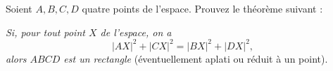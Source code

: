 Soient $A, B, C, D$ quatre points de l'espace. Prouvez le théorème
suivant :

\emph{Si, pour tout point $X$ de l'espace, on a}
\[
|AX|^2 + |CX|^2 = |BX|^2 + |DX|^2,
\]
\emph{alors $ABCD$ est un rectangle} (éventuellement aplati ou réduit à un
point).

